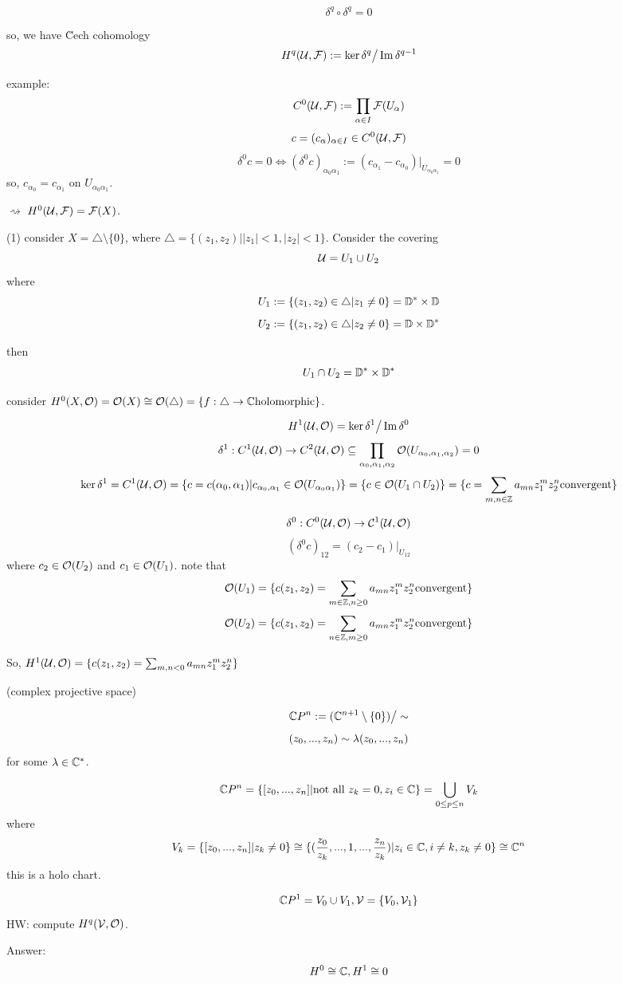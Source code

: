 \begin{prop}
$$\delta^q\circ\delta^q=0$$
\end{prop}

so, we have \u{C}ech cohomology
$$H^q(\mathcal{U},\mathcal{F}):=\ker\delta^q\big/\operatorname{Im}\delta^{q-1}$$

example:
$$C^0(\mathcal{U},\mathcal{F}):=\prod_{\alpha\in I}\mathcal{F}(U_{\alpha})$$
$$c=(c_{\alpha})_{\alpha\in I}\in C^0(\mathcal{U},\mathcal{F})$$
$$\delta^0c=0\iff(\delta^0c)_{\alpha_0\alpha_1}
:=(c_{\alpha_1}-c_{\alpha_0})|_{U_{\alpha_0\alpha_1}}=0$$
so, $c_{\alpha_0}=c_{\alpha_1}$ on $U_{\alpha_0\alpha_1}$.

$\rightsquigarrow$ $H^0(\mathcal{U},\mathcal{F})=\mathcal{F}(X)$.

\begin{example}
(1) consider $X=\triangle\setminus\{0\}$, where $\triangle=
\{(z_1,z_2)||z_1|<1,|z_2|<1\}$. Consider the covering
$$\mathcal{U}=U_1\cup U_2$$
where
$$U_1:=\{(z_1,z_2)\in\triangle|z_1\neq 0\}=\mathbb{D}^*\times\mathbb{D}$$
$$U_2:=\{(z_1,z_2)\in\triangle|z_2\neq 0\}=\mathbb{D}\times\mathbb{D}^*$$

then
$$U_1\cap U_2=\mathbb{D}^*\times\mathbb{D}^*$$

consider $H^0(X,\mathcal{O})=\mathcal{O}(X)\cong\mathcal{O}(\triangle)
=\{f:\triangle\to\mathbb{C}\text{holomorphic}\}$.

$$H^1(\mathcal{U},\mathcal{O})=\ker\delta^1\big/\operatorname{Im}\delta^0$$
$$\delta^1:C^1(\mathcal{U},\mathcal{O})\to C^2(\mathcal{U},\mathcal{O})\subseteq
\prod_{\alpha_0,\alpha_1,\alpha_2}\mathcal{O}(U_{\alpha_0,\alpha_1,\alpha_2})=0$$
$$\ker\delta^1=
C^1(\mathcal{U},\mathcal{O})=\{c=c(\alpha_0,\alpha_1)|c_{\alpha_0,\alpha_1}\in\mathcal{O}(U_{\alpha_0\alpha_1})\}
=\{c\in\mathcal{O}(U_1\cap U_2)\}=\{c=\sum_{m,n\in\mathbb{Z}}a_{mn}z_1^mz_2^n\text{convergent}\}$$

$$\delta^0:C^0(\mathcal{U},\mathcal{O})\to\mathcal{C}^1(\mathcal{U},\mathcal{O})$$
$$(\delta^0c)_{12}=(c_2-c_1)|_{U_{12}}$$
where $c_2\in\mathcal{O}(U_2)$ and $c_1\in\mathcal{O}(U_1)$.
note that
$$\mathcal{O}(U_1)=\{c(z_1,z_2)=\sum_{m\in\mathbb{Z},n\geq 0}a_{mn}z_1^mz_2^n\text{convergent}\}$$
$$\mathcal{O}(U_2)=\{c(z_1,z_2)=\sum_{n\in\mathbb{Z},m\geq 0}a_{mn}z_1^mz_2^n\text{convergent}\}$$

So, $H^1(\mathcal{U},\mathcal{O})=
\{c(z_1,z_2)=\sum_{m,n<0}a_{mn}z_1^mz_2^n\}$
\end{example}

\begin{example}(complex projective space)

$$\mathbb{C} P^n:=(\mathbb{C}^{n+1}\setminus\{0\})\big/\sim$$
$$(z_0,...,z_n)\sim\lambda(z_0,...,z_n)$$
for some $\lambda\in\mathbb{C}^*$.

$$\mathbb{C} P^n=\{[z_0,...,z_n]|\text{not all $z_k=0$},z_i\in\mathbb{C}\}
=\bigcup_{0\leq p\leq n}V_k$$
where
$$V_k=\{[z_0,...,z_n]|z_k\neq 0\}
\cong \{(\frac{z_0}{z_k},...,1,...,\frac{z_n}{z_k})|
z_i\in\mathbb{C},i\neq k, z_k\neq 0\}\cong \mathbb{C}^n$$
this is a holo chart.

$$\mathbb{C} P^1=V_0\cup V_1,\mathcal{V}=\{V_0,\mathcal{V}_1\}$$
HW: compute $H^q(\mathcal{V},\mathcal{O})$.

Answer:
$$H^0\cong\mathbb{C},H^1\cong 0$$
\end{example}

